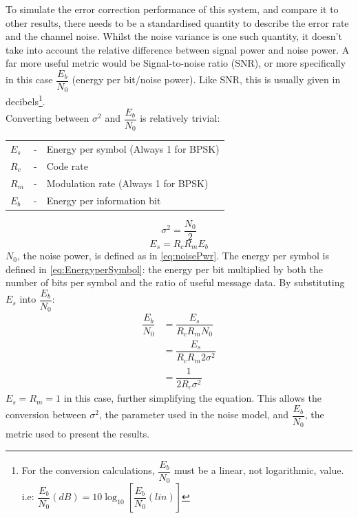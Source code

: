 \documentclass[11pt]{article}
\numberwithin{equation}{subsection}
\begin{document}
To simulate the error correction performance of this system, and compare it to other results, there needs to be a standardised quantity to describe the error rate and the channel noise. Whilst the noise variance is one such quantity, it doesn't take into account the relative difference between signal power and noise power. A far more useful metric would be Signal-to-noise ratio (SNR), or more specifically in this case $\dfrac{E_b}{N_0}$ (energy per bit/noise power). Like SNR, this is usually given in decibels\footnote{For the conversion calculations, $\dfrac{E_b}{N_0}$ must be a linear, not logarithmic, value. i.e: $\dfrac{E_b}{N_0}(dB) = 10\log_{10}\left[\dfrac{E_b}{N_0}(lin)\right]$}. 
\vspace{3mm} \\
\noindent
Converting between $\sigma^2$ and $\dfrac{E_b}{N_0}$ is relatively trivial:
\vspace{3mm} \\
\noindent
\begin{tabular}{lcl}
$E_s$ & - & Energy per symbol (Always 1 for BPSK) \\
$R_c$ & - & Code rate \\
$R_m$ & - & Modulation rate (Always 1 for BPSK) \\
$E_b$ & - & Energy per information bit \\
\end{tabular}
\begin{equation} \label{eq:noisePwr}
\sigma^2 = \dfrac{N_0}{2}
\end{equation}
\begin{equation}\label{eq:EnergyperSymbol}
E_s = R_cR_mE_b
\end{equation}
$N_0$, the noise power, is defined as in \ref{eq:noisePwr}. The energy per symbol is defined in \ref{eq:EnergyperSymbol}: the energy per bit multiplied by both the number of bits per symbol and the ratio of useful message data. By substituting $E_s$ into $\dfrac{E_b}{N_0}$:
\begin{equation}
\begin{aligned}
\dfrac{E_b}{N_0} &= \dfrac{E_s}{R_cR_mN_0} \\
&= \dfrac{E_s}{R_cR_m2\sigma^2} \\
&= \dfrac{1}{2R_c\sigma^2}
\end{aligned}
\end{equation}
$E_s = R_m = 1$ in this case, further simplifying the equation. This allows the conversion between $\sigma^2$, the parameter used in the noise model, and $\dfrac{E_b}{N_0}$, the metric used to present the results.
\end{document}
